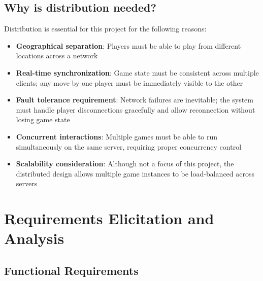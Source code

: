 \documentclass{scrartcl}
\begin{document}
\subsection{Why is distribution needed?}

Distribution is essential for this project for the following reasons:

\begin{itemize}
  \item \textbf{Geographical separation}: Players must be able to play from different locations across a network
  \item \textbf{Real-time synchronization}: Game state must be consistent across multiple clients;
    any move by one player must be immediately visible to the other
  \item \textbf{Fault tolerance requirement}: Network failures are inevitable;
    the system must handle player disconnections gracefully and allow reconnection without losing game state
  \item \textbf{Concurrent interactions}: Multiple games must be able to run simultaneously on the same server,
    requiring proper concurrency control
  \item \textbf{Scalability consideration}: Although not a focus of this project,
    the distributed design allows multiple game instances to be load-balanced across servers
\end{itemize}


\section{Requirements Elicitation and Analysis}\label{requirements}

\subsection{Functional Requirements}
\end{document}

